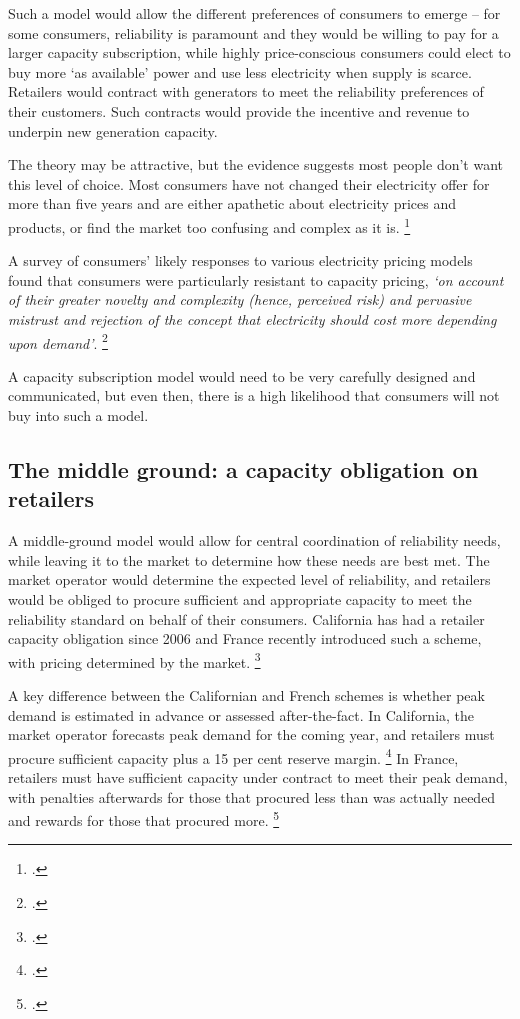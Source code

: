 \documentclass[FrontPage]{grattan}
\begin{document}
Such a model would allow the different preferences of consumers to emerge -- for some consumers, reliability is paramount and they would be willing to pay for a larger capacity subscription, while highly price-conscious consumers could elect to buy more `as available' power and use less electricity when supply is scarce. Retailers would contract with generators to meet the reliability preferences of their customers. Such contracts would provide the incentive and revenue to underpin new generation capacity.

The theory may be attractive, but the evidence suggests most people don't want this level of choice. Most consumers have not changed their electricity offer for more than five years and are either apathetic about electricity prices and products, or find the market too confusing and complex as it is.%
\footcites{AEMC2016RetailCompReview}{CIGRE2016CapacityMechanisms}

A survey of consumers' likely responses to various electricity pricing models found that consumers were particularly resistant to capacity pricing, \emph{`on account of their greater novelty and complexity (hence, perceived risk) and pervasive mistrust and rejection of the concept that electricity should cost more depending upon demand'}.%
\footcite{CSIRO2015CostReflectivePricing}

A capacity subscription model would need to be very carefully designed and communicated, but even then, there is a high likelihood that consumers will not buy into such a model.


\subsection{The middle ground: a capacity obligation on retailers}\label{subsec:the-middle-ground-a-market-with-central-coordination}
A middle-ground model would allow for central coordination of reliability needs, while leaving it to the market to determine how these needs are best met. The market operator would determine the expected level of reliability, and retailers would be obliged to procure sufficient and appropriate capacity to meet the reliability standard on behalf of their consumers. California has had a retailer capacity obligation since 2006 and France recently introduced such a scheme, with pricing determined by the market.%
\footcites{CPUC2017ResourceAdequacy}{RTE2017CapacityObligation}

A key difference between the Californian and French schemes is whether peak demand is estimated in advance or assessed after-the-fact. In California, the market operator forecasts peak demand for the coming year, and retailers must procure sufficient capacity plus a 15 per cent reserve margin.%
\footcite{CPUC2017ResourceAdequacy}
In France, retailers must have sufficient capacity under contract to meet their peak demand, with penalties afterwards for those that procured less than was actually needed and rewards for those that procured more.%
\footcite{RTE2017CapacityObligation}
\end{document}
